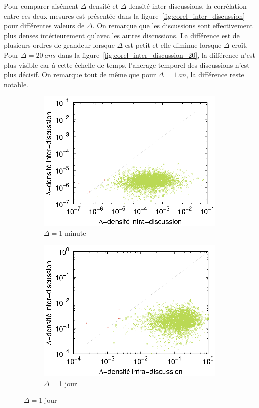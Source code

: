 Pour comparer aisément $\Delta$-densité et $\Delta$-densité inter discussions, la corrélation entre ces deux mesures est présentée dans la figure~\ref{fig:corel_inter_discussion} pour différentes valeurs de $\Delta$.
On remarque que les discussions sont effectivement plus denses intérieurement qu'avec les autres discussions.
La différence est de plusieurs ordres de grandeur lorsque $\Delta$ est petit et elle diminue lorsque $\Delta$ croît.
Pour $\Delta=20\ ans$ dans la figure~\ref{fig:corel_inter_discussion_20}, la différence n'est plus visible car à cette échelle de temps, l'ancrage temporel des discussions n'est plus décisif.
On remarque tout de même que pour $\Delta=1\ an$, la différence reste notable.
 

\begin{figure}[h]
\centering
	\begin{subfigure}{0.4\textwidth}
		\includegraphics[width=\linewidth]{img/mailing/DensityCurve/120/mean.eps}
		\caption{$\Delta= $1 minute}		
	\end{subfigure}
	\begin{subfigure}{0.4\textwidth}
		\includegraphics[width=\linewidth]{img/mailing/DensityCurve/172800/mean.eps}
		\caption{$\Delta= $1 jour}		
	\end{subfigure}
	

\end{figure}
